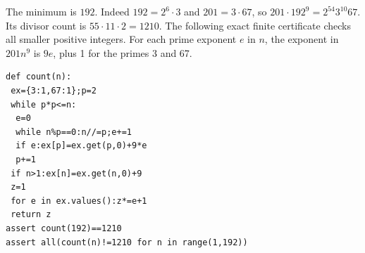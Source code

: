 The minimum is $\boxed{192}$. Indeed $ 192=2^6\cdot3 $ and $ 201=3\cdot67 $, so $ 201\cdot192^9=2^{54}3^{10}67 $. Its divisor count is $ 55\cdot11\cdot2=1210 $. The following exact finite certificate checks all smaller positive integers. For each prime exponent $ e $ in $ n $, the exponent in $ 201n^9 $ is $ 9e $, plus 1 for the primes 3 and 67.
\begin{verbatim}
def count(n):
 ex={3:1,67:1};p=2
 while p*p<=n:
  e=0
  while n%p==0:n//=p;e+=1
  if e:ex[p]=ex.get(p,0)+9*e
  p+=1
 if n>1:ex[n]=ex.get(n,0)+9
 z=1
 for e in ex.values():z*=e+1
 return z
assert count(192)==1210
assert all(count(n)!=1210 for n in range(1,192))
\end{verbatim}
